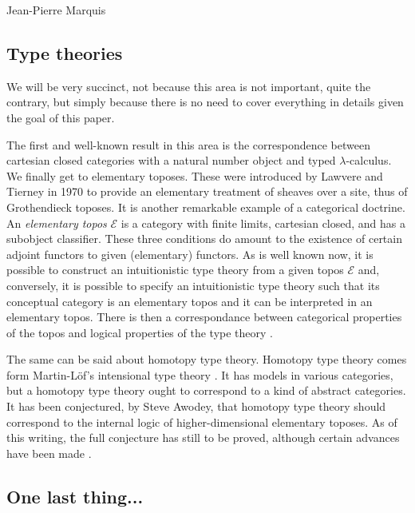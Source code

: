 \begin{artengenv}{Jean-Pierre Marquis}
\subsection{Type theories}

We will be very succinct, not because this area is not important, quite the contrary, but simply because there is no need to cover everything in details given the goal of this paper.  

The first and well-known result in this area is the correspondence between cartesian closed categories with a natural number object and typed $\lambda$-calculus. We finally get to elementary toposes. These were introduced by Lawvere and Tierney in 1970 to provide an elementary treatment of sheaves over a site, thus of Grothendieck toposes. It is another remarkable example of a categorical doctrine.
An \emph{elementary topos} $\mathcal{E}$ is a category with finite limits, cartesian closed, and has a subobject classifier. These three conditions do amount to the existence of certain adjoint functors to given (elementary) functors. As is well known now, it is possible to construct an intuitionistic type theory from a given topos $\mathcal{E}$ and, conversely, it is possible to specify an intuitionistic type theory such that its conceptual category is an elementary topos and it can be interpreted in an elementary topos. There is then a correspondance between categorical properties of the topos and logical properties of the type theory \parencite[see][]{Boileau1981,Lambek1988}.

The same can be said about homotopy type theory. Homotopy type theory comes form Martin-Löf's intensional type theory \parencite[see][]{HoTT2013}. It has models in various categories, but a homotopy type theory ought to correspond to a kind of abstract categories. It has been conjectured, by Steve Awodey, that homotopy type theory should correspond to the internal logic of higher-dimensional elementary toposes. As of this writing, the full conjecture has still to be proved, although certain advances have been made \parencite[see][]{Kapulkin2018}. 

\subsection{One last thing...}


\end{artengenv}
